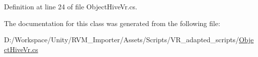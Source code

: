 Definition at line 24 of file Object\+Hive\+Vr.\+cs.



The documentation for this class was generated from the following file\+:\begin{DoxyCompactItemize}
\item 
D\+:/\+Workspace/\+Unity/\+R\+V\+M\+\_\+\+Importer/\+Assets/\+Scripts/\+V\+R\+\_\+adapted\+\_\+scripts/\mbox{\hyperlink{_object_hive_vr_8cs}{Object\+Hive\+Vr.\+cs}}\end{DoxyCompactItemize}
